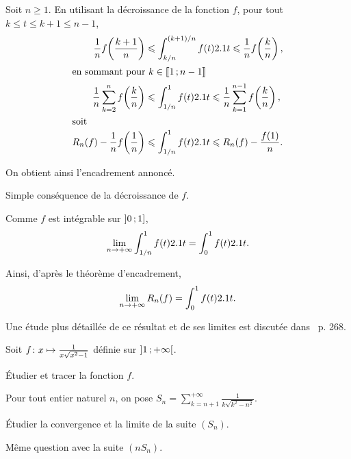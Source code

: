 \begin{elemsolution}
\begin{reponses}
\item Soit $n \geqslant 1$. En utilisant la décroissance de la fonction $f$, pour tout $k \leqslant t \leqslant k + 1 \leqslant n-1$,
\begin{align*}
\frac{1}{n} f\mathopen{}\left(\frac{k+1}{n}\right) &\leqslant \int_{k/n}^{(k+1)/n} f(t) \d t \leqslant \frac{1}{n} f\mathopen{}\left(\frac{k}{n}\right),\\
\intertext{en sommant pour $k \in \interent{1}{n-1}$}
\frac{1}{n} \sum\limits_{k=2}^{n} f\mathopen{}\left(\frac{k}{n}\right) &\leqslant \displaystyle\int_{1/n}^1 f(t) \d t \leqslant \frac{1}{n} \sum\limits_{k=1}^{n-1} f\mathopen{}\left(\frac{k}{n}\right),\\
\intertext{soit}
R_n(f) - \frac{1}{n} f\mathopen{}\left(\frac{1}{n}\right) &\leqslant \displaystyle\int_{1/n}^1 f(t) \d t \leqslant R_n(f) - \frac{f(1)}{n}.
\end{align*}

On obtient ainsi l'encadrement annoncé.

\item Simple conséquence de la décroissance de $f$.

\item Comme $f$ est intégrable sur $\interof{0}{1}$,
\[
\lim\limits_{n\to+\infty} \displaystyle\int_{1/n}^1 f(t) \d t = \displaystyle\int_0^1 f(t) \d t.
\]

\item Ainsi, d'après le théorème d'encadrement,
\[
\lim\limits_{n\to+\infty} R_n(f) = \displaystyle\int_0^1 f(t) \d t.
\]
\end{reponses}
\end{elemsolution}

\begin{remarque}
Une étude plus détaillée de ce résultat et de ses limites est discutée dans~\cite{truc2019} p. 268.
\end{remarque}


\begin{exercice}
Soit $\fonctionligne[f]{x}{\frac{1}{x \sqrt{x^2 - 1}}}$ définie sur $\interoo{1}{+\infty}$.
\begin{questions}
\item Étudier et tracer la fonction $f$.
\end{questions}
Pour tout entier naturel $n$, on pose $S_n = \sum\limits_{k=n+1}^{+\infty} \frac{1}{k \sqrt{k^2 - n^2}}$.
\begin{questions}[resume]
\item Étudier la convergence et la limite de la suite $(S_n)$.

\item Même question avec la suite $(n S_n)$.
\end{questions}
\end{exercice}

